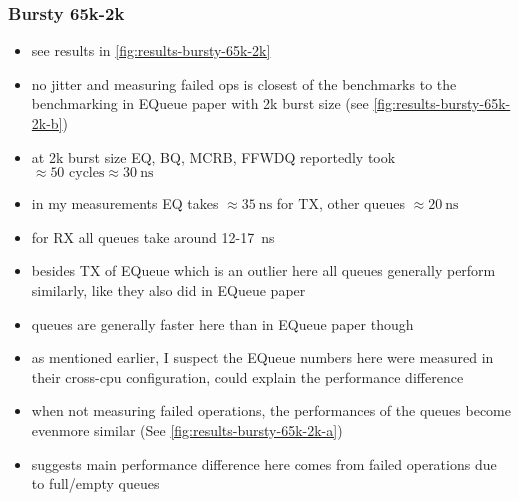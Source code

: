 \subsubsection{Bursty 65k-2k}
\begin{itemize}
    \item see results in \autoref{fig:results-bursty-65k-2k}
    \item no jitter and measuring failed ops is closest of the benchmarks to the benchmarking in EQueue paper
        with 2k burst size (see \autoref{fig:results-bursty-65k-2k-b})
    \item at 2k burst size EQ, BQ, MCRB, FFWDQ reportedly took $\approx 50\text{ cycles} \approx \SI{30}{\nano\second}$
    \item in my measurements EQ takes $\approx \SI{35}{\nano\second}$ for TX, other queues $\approx
        \SI{20}{\nano\second}$
    \item for RX all queues take around 12-\SI{17}{\nano\second}
    \item besides TX of EQueue which is an outlier here all queues generally perform similarly, like they also did
        in EQueue paper
    \item queues are generally faster here than in EQueue paper though
    \item as mentioned earlier, I suspect the EQueue numbers here were measured in their cross-cpu
        configuration, could explain the performance difference
    \item when not measuring failed operations, the performances of the queues become evenmore similar (See
        \autoref{fig:results-bursty-65k-2k-a})
    \item suggests main performance difference here comes from failed operations due to full/empty queues
\end{itemize}


